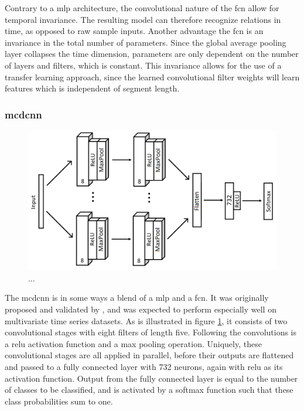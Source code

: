 
Contrary to a \acrshort{mlp} architecture, the convolutional nature of the \acrshort{fcn} allow for temporal invariance. The resulting model can therefore recognize relations in time, as opposed to raw sample inputs. Another advantage the \acrshort{fcn} is an invariance in the total number of parameters. Since the global average pooling layer collapses the time dimension, parameters are only dependent on the number of layers and filters, which is constant. This invariance allows for the use of a transfer learning approach, since the learned convolutional filter weights will learn features which is independent of segment length.

\newpage
\subsubsection{\acrlong{mcdcnn}}

\begin{figure}[h]
    \centering
    \includegraphics[width=\textwidth]{figures/impl_MCDCNN.png}
    \caption{...}
    \label{fig:impl_MCDCNN}
\end{figure}

The \acrfull{mcdcnn} is in some ways a blend of a \acrshort{mlp} and a \acrshort{fcn}. It was originally proposed and validated by \textcite{zheng2014}, and was expected to perform especially well on multivariate time series datasets. As is illustrated in figure \ref{fig:impl_MCDCNN}, it consists of two convolutional stages with eight filters of length five. Following the convolutions is a \acrshort{relu} activation function and a max pooling operation. Uniquely, these convolutional stages are all applied in parallel, before their outputs are flattened and passed to a fully connected layer with 732 neurons, again with \acrshort{relu} as its activation function. Output from the fully connected layer is equal to the number of classes to be classified, and is activated by a softmax function such that these class probabilities sum to one.

